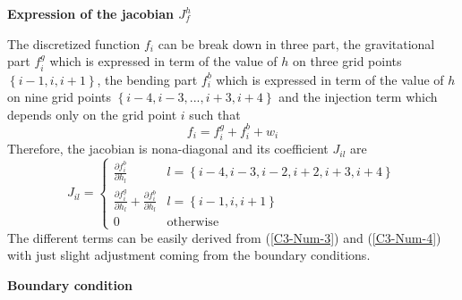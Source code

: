 \vspace{.5cm}    \textbf{Expression   of    the   jacobian    $J_f^h$}
\vspace{.5cm}

The discretized  function $f_i$ can be  break down in three  part, the
gravitational part $f_i^{g}$  which is expressed in term  of the value
of $h$ on three  grid points $\left\{{i-1,i,i+1}\right\}$, the bending
part $f_i^{b}$ which is expressed in term  of the value of $h$ on nine
grid points  $\left\{{i-4,i-3,...,i+3,i+4}\right\}$ and  the injection
term which depends only on the grid point $i$ such that
\begin{equation}
  f_i = f_i^g+f_i^b+w_i
\end{equation}
Therefore, the jacobian is  nona-diagonal and its coefficient $J_{il}$
are
\begin{equation}
  J_{il}=
  \begin{cases}
    \frac{\partial f^{b}_i}{\partial h_{l}} &
    l = \left\{{i-4,i-3,i-2,i+2,i+3,i+4}\right\}\\
    \frac{\partial       f^{g}_i}{\partial       h_{l}}+\frac{\partial
      f^{b}_i}{\partial h_{l}} & l =
    \left\{{i-1,i,i+1}\right\}\\
    0 & \text{otherwise}
  \end{cases}
  \label{C2-eq12}
\end{equation}
The different  terms can be  easily derived from  (\ref{C3-Num-3}) and
(\ref{C3-Num-4}) with just slight  adjustment coming from the boundary
conditions.

\vspace{.5cm} \textbf{Boundary condition} \vspace{.5cm}

